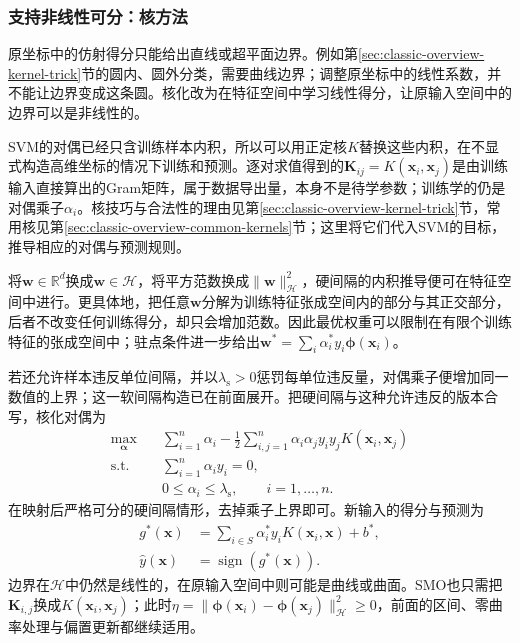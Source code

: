 \subsubsection{支持非线性可分：核方法}
\label{sec:classification-svm-kernels}

原坐标中的仿射得分只能给出直线或超平面边界。例如第\ref{sec:classic-overview-kernel-trick}节的圆内、圆外分类，需要曲线边界；调整原坐标中的线性系数，并不能让边界变成这条圆。核化改为在特征空间中学习线性得分，让原输入空间中的边界可以是非线性的。

SVM的对偶已经只含训练样本内积，所以可以用正定核$K$替换这些内积，在不显式构造高维坐标的情况下训练和预测。逐对求值得到的$\bm K_{ij}=K(\bm{x}_i,\bm{x}_j)$是由训练输入直接算出的Gram矩阵，属于数据导出量，本身不是待学参数；训练学的仍是对偶乘子$\alpha_i$。核技巧与合法性的理由见第\ref{sec:classic-overview-kernel-trick}节，常用核见第\ref{sec:classic-overview-common-kernels}节；这里将它们代入SVM的目标，推导相应的对偶与预测规则。

将$\bm{w}\in\mathbb{R}^d$换成$\bm{w}\in\mathcal{H}$，将平方范数换成$\lVert\bm{w}\rVert_{\mathcal{H}}^2$，硬间隔的内积推导便可在特征空间中进行。更具体地，把任意$\bm{w}$分解为训练特征张成空间内的部分与其正交部分，后者不改变任何训练得分，却只会增加范数。因此最优权重可以限制在有限个训练特征的张成空间中；驻点条件进一步给出$\bm{w}^{\ast}=\sum_i\alpha_i^{\ast}y_i\bm{\phi}(\bm{x}_i)$。

若还允许样本违反单位间隔，并以$\lambda_{\mathrm{s}}>0$惩罚每单位违反量，对偶乘子便增加同一数值的上界；这一软间隔构造已在前面展开。把硬间隔与这种允许违反的版本合写，核化对偶为
\begin{equation}
  \begin{aligned}
    \max_{\bm{\alpha}}\quad&
      \sum_{i=1}^n\alpha_i
       -\frac12\sum_{i,j=1}^n
          \alpha_i\alpha_j y_i y_j
          K(\bm{x}_i,\bm{x}_j)\\
    \text{s.t.}\quad&
      \sum_{i=1}^n\alpha_i y_i=0,\\
    &0\le\alpha_i\le\lambda_{\mathrm{s}},
      \qquad i=1,\ldots,n.
  \end{aligned}
  \label{eq:classification-svm-kernel-dual}
\end{equation}
在映射后严格可分的硬间隔情形，去掉乘子上界即可。新输入的得分与预测为
\begin{equation}
  \begin{aligned}
    g^{\ast}(\bm{x})
      &=\sum_{i\in S}\alpha_i^{\ast}y_i
         K(\bm{x}_i,\bm{x})+b^{\ast},\\
    \hat y(\bm{x})&=\operatorname{sign}(g^{\ast}(\bm{x})).
  \end{aligned}
  \label{eq:classification-svm-kernel-prediction}
\end{equation}
边界在$\mathcal{H}$中仍然是线性的，在原输入空间中则可能是曲线或曲面。SMO也只需把$\bm{K}_{i,j}$换成$K(\bm{x}_i,\bm{x}_j)$；此时$\eta=\lVert\bm{\phi}(\bm{x}_i)-\bm{\phi}(\bm{x}_j)\rVert_{\mathcal{H}}^2\ge0$，前面的区间、零曲率处理与偏置更新都继续适用。

